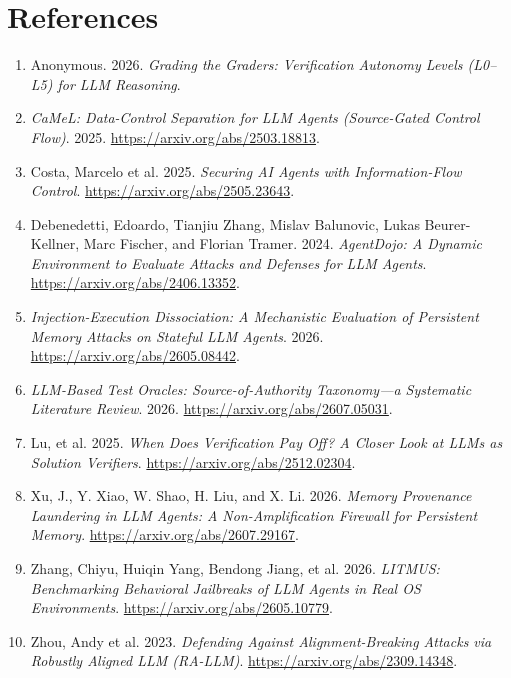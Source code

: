 \documentclass[11pt]{article}
\begin{document}
\section*{References}\begin{enumerate}

\item

Anonymous. 2026. \emph{Grading the Graders: Verification Autonomy Levels (L0--L5) for LLM Reasoning}.

\item

\emph{CaMeL: Data-Control Separation for LLM Agents (Source-Gated Control Flow)}. 2025. \url{https://arxiv.org/abs/2503.18813}.

\item

{Costa, Marcelo et al.} 2025. \emph{Securing AI Agents with Information-Flow Control}. \url{https://arxiv.org/abs/2505.23643}.

\item

Debenedetti, Edoardo, Tianjiu Zhang, Mislav Balunovic, Lukas Beurer-Kellner, Marc Fischer, and Florian Tramer. 2024. \emph{AgentDojo: A Dynamic Environment to Evaluate Attacks and Defenses for LLM Agents}. \url{https://arxiv.org/abs/2406.13352}.

\item

\emph{Injection-Execution Dissociation: A Mechanistic Evaluation of Persistent Memory Attacks on Stateful LLM Agents}. 2026. \url{https://arxiv.org/abs/2605.08442}.

\item

\emph{LLM-Based Test Oracles: Source-of-Authority Taxonomy---a Systematic Literature Review}. 2026. \url{https://arxiv.org/abs/2607.05031}.

\item

{Lu, et al.} 2025. \emph{When Does Verification Pay Off? A Closer Look at LLMs as Solution Verifiers}. \url{https://arxiv.org/abs/2512.02304}.

\item

Xu, J., Y. Xiao, W. Shao, H. Liu, and X. Li. 2026. \emph{Memory Provenance Laundering in LLM Agents: A Non-Amplification Firewall for Persistent Memory}. \url{https://arxiv.org/abs/2607.29167}.

\item

Zhang, Chiyu, Huiqin Yang, Bendong Jiang, et al. 2026. \emph{LITMUS: Benchmarking Behavioral Jailbreaks of LLM Agents in Real OS Environments}. \url{https://arxiv.org/abs/2605.10779}.

\item

{Zhou, Andy et al.} 2023. \emph{Defending Against Alignment-Breaking Attacks via Robustly Aligned LLM (RA-LLM)}. \url{https://arxiv.org/abs/2309.14348}.

\end{enumerate}
\end{document}
